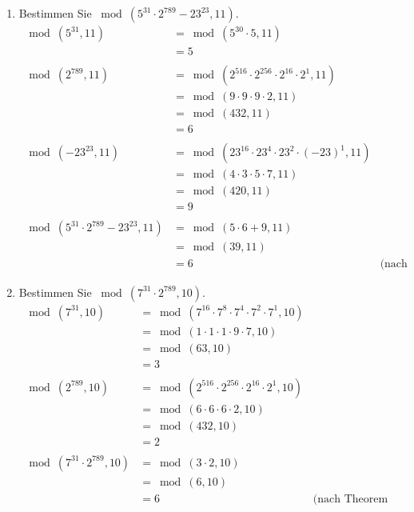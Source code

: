 \begin{enumerate}[label=(\alph*)]
		\item  Bestimmen Sie $ \bmod(5^{31} \cdot 2^{789}-23^{23}, 11) $.
		\begin{align*}
			\bmod(5^{31},11) &= \bmod(5^{30}\cdot5,11)
			\\&= 5 \\\\
			\bmod(2^{789},11) &= \bmod(2^{516}\cdot2^{256}\cdot2^{16}\cdot2^1,11)
			\\&= \bmod(9\cdot 9\cdot 9\cdot 2, 11)
			\\&= \bmod(432,11)
			\\&= 6 \\\\
			\bmod(-23^{23},11) &= \bmod(23^{16}\cdot23^{4}\cdot23^{2}\cdot(-23)^1,11)
			\\&= \bmod(4\cdot 3\cdot 5\cdot 7, 11)
			\\&= \bmod(420,11)
			\\&= 9 \\\\ 
			\bmod(5^{31} \cdot 2^{789}-23^{23}, 11) &= \bmod(5 \cdot 6 + 9,11)
			\\&= \bmod(39,11)
			\\&= 6 
		 	&\textrm{(nach Theorem 1.2 (BM))}
		\end{align*}

		\item  Bestimmen Sie $ \bmod(7^{31} \cdot 2^{789}, 10) $.
		\begin{align*}
			\bmod(7^{31},10) &= \bmod(7^{16}\cdot7^{8}\cdot7^{4}\cdot7^{2}\cdot7^{1},10)
			\\&= \bmod(1\cdot1\cdot1\cdot9\cdot7,10)
			\\&= \bmod(63,10)
			\\&= 3 \\\\
			\bmod(2^{789},10) &= \bmod(2^{516}\cdot2^{256}\cdot2^{16}\cdot2^1,10)
			\\&= \bmod(6\cdot 6\cdot 6\cdot 2, 10)
			\\&= \bmod(432,10)
			\\&= 2 \\\\
			\bmod(7^{31} \cdot 2^{789}, 10) &= \bmod(3 \cdot 2,10)
			\\&= \bmod(6,10)
			\\&= 6 
		 	&\textrm{(nach Theorem 1.2 (BM))}
		\end{align*}


\end{enumerate}
